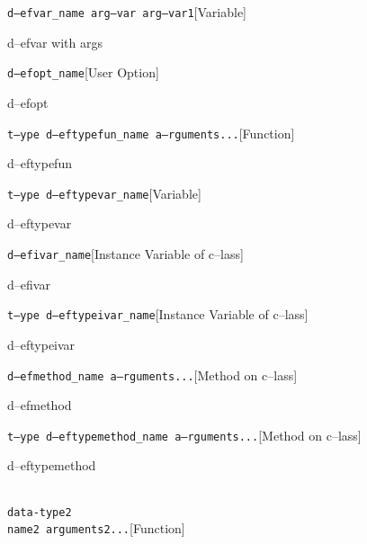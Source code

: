 \documentclass{book}
\begin{document}
\begin{titlepage}
\noindent\texttt\bgroup{}d--efvar\_name arg--var arg--var1\egroup{}\hfill[Variable]



%
d--efvar with args

\noindent\texttt\bgroup{}d--efopt\_name\egroup{}\hfill[User Option]



%
d--efopt

\noindent\texttt\bgroup{}t--ype d--eftypefun\_name a--rguments...\egroup{}\hfill[Function]



%
d--eftypefun

\noindent\texttt\bgroup{}t--ype d--eftypevar\_name\egroup{}\hfill[Variable]



%
d--eftypevar

\noindent\texttt\bgroup{}d--efivar\_name\egroup{}\hfill[Instance Variable of c--lass]



%
d--efivar

\noindent\texttt\bgroup{}t--ype d--eftypeivar\_name\egroup{}\hfill[Instance Variable of c--lass]



%
d--eftypeivar

\noindent\texttt\bgroup{}d--efmethod\_name a--rguments...\egroup{}\hfill[Method on c--lass]



%
d--efmethod

\noindent\texttt\bgroup{}t--ype d--eftypemethod\_name a--rguments...\egroup{}\hfill[Method on c--lass]



%
d--eftypemethod


\noindent\texttt\bgroup{}\leavevmode{}\\data-type2\leavevmode{}\\name2 arguments2...\egroup{}\hfill[Function]




\end{titlepage}
\end{document}
